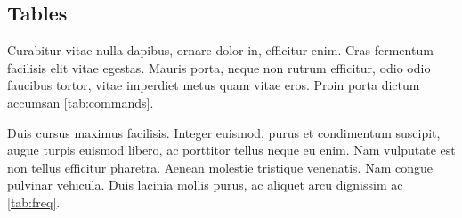 \documentclass[sigconf, nonacm]{acmart}
\begin{document}
\subsection{Tables}

Curabitur vitae nulla dapibus, ornare dolor in, efficitur enim. Cras fermentum facilisis elit vitae egestas. Mauris porta, neque non rutrum efficitur, odio odio faucibus tortor, vitae imperdiet metus quam vitae eros. Proin porta dictum accumsan \autoref{tab:commands}.

Duis cursus maximus facilisis. Integer euismod, purus et condimentum suscipit, augue turpis euismod libero, ac porttitor tellus neque eu enim. Nam vulputate est non tellus efficitur pharetra. Aenean molestie tristique venenatis. Nam congue pulvinar vehicula. Duis lacinia mollis purus, ac aliquet arcu dignissim ac \autoref{tab:freq}. 
\end{document}
